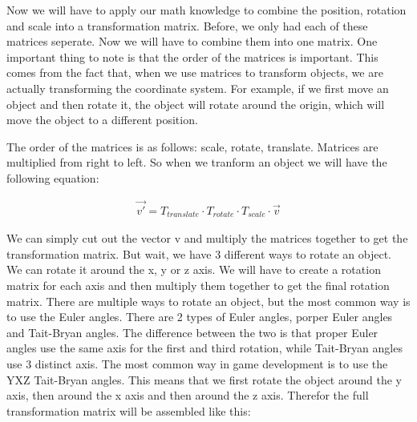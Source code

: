 \documentclass[12pt]{report} \usepackage{preamble}
\begin{document}
Now we will have to apply our math knowledge to combine the position, rotation and scale into a transformation matrix.
Before, we only had each of these matrices seperate. Now we will have to combine them into one matrix.
One important thing to note is that the order of the matrices is important. This comes from the fact that, when we use matrices to transform objects,
we are actually transforming the coordinate system. For example, if we first move an object and then rotate it, the object will rotate around the origin,
which will move the object to a different position.

The order of the matrices is as follows: scale, rotate, translate. Matrices are multiplied from right to left. So when we tranform an object we will have the following equation:

\begin{equation}
	\begin{aligned}
		\vec{v'} = T_{translate} \cdot T_{rotate} \cdot T_{scale} \cdot \vec{v}
	\end{aligned}
\end{equation}

We can simply cut out the vector v and multiply the matrices together to get the transformation matrix. But wait, we have 3 different ways to rotate an object.
We can rotate it around the x, y or z axis. We will have to create a rotation matrix for each axis and then multiply them together to get the final rotation matrix.
There are multiple ways to rotate an object, but the most common way is to use the Euler angles. There are 2 types of Euler angles, porper Euler angles and Tait-Bryan angles.
The difference between the two is that proper Euler angles use the same axis for the first and third rotation, while Tait-Bryan angles use 3 distinct axis.
The most common way in game development is to use the YXZ Tait-Bryan angles. This means that we first rotate the object around the y axis, then around the x axis and then around the z axis.
Therefor the full transformation matrix will be assembled like this:
\end{document}
